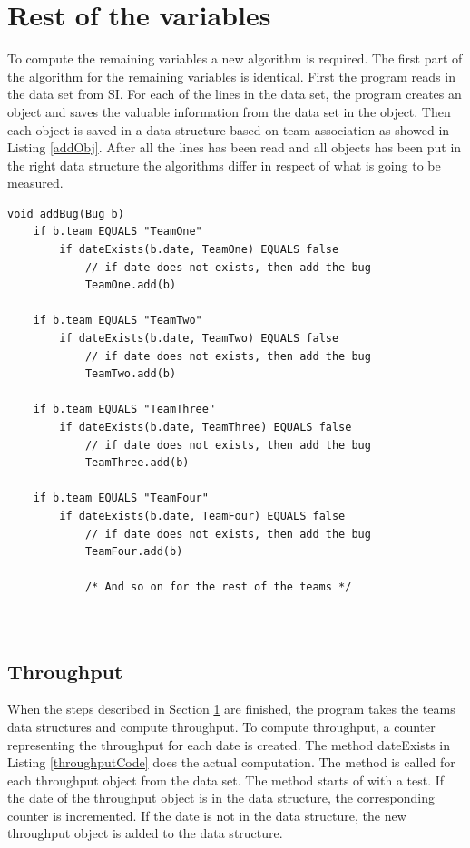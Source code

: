 \documentclass[UKenglish]{ifimaster}  %
\begin{document}
 \section{Rest of the variables}
 \label{sec:rotv}
To compute the remaining variables a new algorithm is required.  The first part of the algorithm for the remaining variables is identical. First the program reads in the data set from SI. For each of the lines in the data set, the program creates an object and saves the valuable information from the data set in the object. Then each object is saved in a data structure based on team association as showed in Listing \ref{addObj}.  After all the lines has been read and all objects has been put in the right data structure the algorithms differ in respect of what is going to be measured.
 \begin{lstlisting}[caption=Pseudocode example of how throughput objects are added, label=addObj]
void addBug(Bug b)
	if b.team EQUALS "TeamOne"
		if dateExists(b.date, TeamOne) EQUALS false
			// if date does not exists, then add the bug
			TeamOne.add(b)
			
	if b.team EQUALS "TeamTwo"
		if dateExists(b.date, TeamTwo) EQUALS false
			// if date does not exists, then add the bug
			TeamTwo.add(b)
			
	if b.team EQUALS "TeamThree"
		if dateExists(b.date, TeamThree) EQUALS false 
			// if date does not exists, then add the bug
			TeamThree.add(b)
			
	if b.team EQUALS "TeamFour"
		if dateExists(b.date, TeamFour) EQUALS false
			// if date does not exists, then add the bug
			TeamFour.add(b)
			
			/* And so on for the rest of the teams */
		
	
 \end{lstlisting}
 
%	
 
\subsection{Throughput}
 \label{sec:TP}
When the steps described in Section \ref{sec:rotv} are finished, the program takes the teams data structures and compute throughput. To compute throughput, a counter representing the throughput for each date is created. The method dateExists in Listing \ref{throughputCode} does the actual computation. The method is called for each throughput object from the data set. The method starts of with a test. If the date of the throughput object is in the data structure, the corresponding counter is incremented.  If the date is not in the data structure, the new throughput object is added to the data structure.
 
\end{document}
